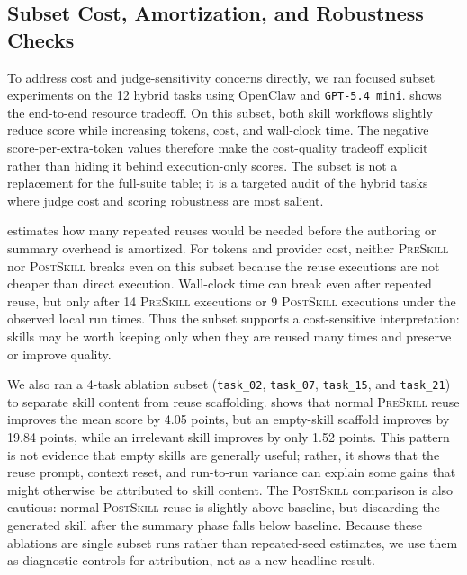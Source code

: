 \documentclass[11pt]{article}
\newcommand{\preskill}{\textsc{PreSkill}}
\newcommand{\postskill}{\textsc{PostSkill}}
\begin{document}
\subsection{Subset Cost, Amortization, and Robustness Checks}
\label{subsec:subset-checks}

To address cost and judge-sensitivity concerns directly, we ran focused subset experiments on the 12 hybrid tasks using OpenClaw and \texttt{GPT-5.4 mini}.
 shows the end-to-end resource tradeoff.
On this subset, both skill workflows slightly reduce score while increasing tokens, cost, and wall-clock time.
The negative score-per-extra-token values therefore make the cost-quality tradeoff explicit rather than hiding it behind execution-only scores.
The subset is not a replacement for the full-suite table; it is a targeted audit of the hybrid tasks where judge cost and scoring robustness are most salient.

 estimates how many repeated reuses would be needed before the authoring or summary overhead is amortized.
For tokens and provider cost, neither \preskill{} nor \postskill{} breaks even on this subset because the reuse executions are not cheaper than direct execution.
Wall-clock time can break even after repeated reuse, but only after 14 \preskill{} executions or 9 \postskill{} executions under the observed local run times.
Thus the subset supports a cost-sensitive interpretation: skills may be worth keeping only when they are reused many times and preserve or improve quality.

We also ran a 4-task ablation subset (\texttt{task\_02}, \texttt{task\_07}, \texttt{task\_15}, and \texttt{task\_21}) to separate skill content from reuse scaffolding.
 shows that normal \preskill{} reuse improves the mean score by 4.05 points, but an empty-skill scaffold improves by 19.84 points, while an irrelevant skill improves by only 1.52 points.
This pattern is not evidence that empty skills are generally useful; rather, it shows that the reuse prompt, context reset, and run-to-run variance can explain some gains that might otherwise be attributed to skill content.
The \postskill{} comparison is also cautious: normal \postskill{} reuse is slightly above baseline, but discarding the generated skill after the summary phase falls below baseline.
Because these ablations are single subset runs rather than repeated-seed estimates, we use them as diagnostic controls for attribution, not as a new headline result.
\end{document}
